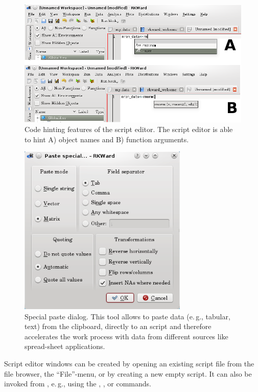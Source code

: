 \begin{figure}[htp]
 \centering
 \includegraphics[width=15.5cm]{../figures/code_hinting.png}
 \caption{Code hinting features of the script editor. The script editor is able to hint A)  object names
and B) function arguments.}
 \label{fig:code_hinting}
\end{figure}

\begin{figure}[htp]
 \centering
 \includegraphics[width=8.042cm,height=8.143cm]{../figures/special_paste.png}
 \caption{Special paste dialog. This tool allows to paste data (e.\,g., tabular, text) from the clipboard, directly to an 
  script and therefore accelerates the work process with data from different sources 
 like spread-sheet applications.
}
 \label{fig:special_paste}
\end{figure}

Script editor windows can be created by opening an existing
 script file from the file browser, the
``File''-menu, or by creating a new empty script. It can
also be invoked from , e.\,g., using the
, , or 
commands.

